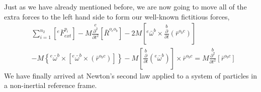 Just as we have already mentioned before, we are now going to move all of the extra forces to the left hand side to form our well-known fictitious forces,
\begin{align}
& \sum^{n_{2}}_{i = 1}\left[{}^{e}\bar{F}^{p_{i}}_{ext}\right] 
 - M\overset{e}{\frac{\partial^{2}}{\partial t^{2}}}[\bar{R}^{o_{e}o_{b}}]
 - 2M\left[{}^{e}\bar{\omega}^{b}\times\overset{b}{\frac{\partial}{\partial t}}(\bar{r}^{o_{b}c})\right] \\ &
 - M\left\{{}^{e}\bar{\omega}^{b}\times\left[{}^{e}\bar{\omega}^{b}\times\left(\bar{r}^{o_{b}c}\right)\right]\right\}
 - M\left[\overset{b}{\frac{\partial}{\partial t}}({}^{e}\bar{\omega}^{b})\right]\times\bar{r}^{o_{b}c}
 = M\overset{b}{\frac{\partial^{2}}{\partial t^{2}}}[\bar{r}^{o_{b}c}]
\label{Newtons Second law System of Particles Non-inertial reference frame}
\end{align}
We have finally arrived at Newton's second law applied to a system of particles in a non-inertial reference frame.

